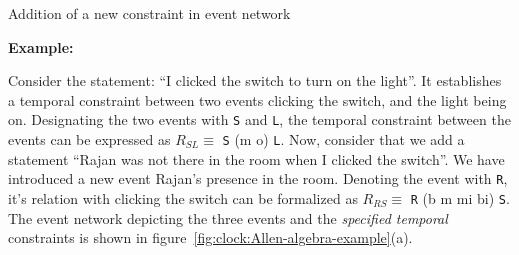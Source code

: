 \begin{algorithm}[!htpb]
	\SetAlgoLined
	\DontPrintSemicolon
	\caption{Addition of a new constraint in event network}
	\label{algo:clock:add}
\end{algorithm}

\vspace{2mm}
\noindent
{\bf Example:}

\noindent
Consider the statement: ``I clicked the switch to turn on the light''. It establishes a temporal constraint between two events 
clicking the switch, and the light being on. Designating the two events with \texttt{S} and \texttt{L}, the temporal constraint
between the events can be expressed as $R_{SL} \equiv$ \texttt{S} (m o) \texttt{L}. 
Now, consider that we add a statement ``Rajan was not there in the room when I clicked the switch''. We have introduced a new event
Rajan's presence in the room. Denoting the event with \texttt{R}, it's relation with clicking the switch can be formalized as 
$R_{RS} \equiv$ \texttt{R} (b m mi bi) \texttt{S}. 
The event network depicting the three events and the {\it specified temporal} constraints is shown in 
figure~\ref{fig:clock:Allen-algebra-example}(a).

